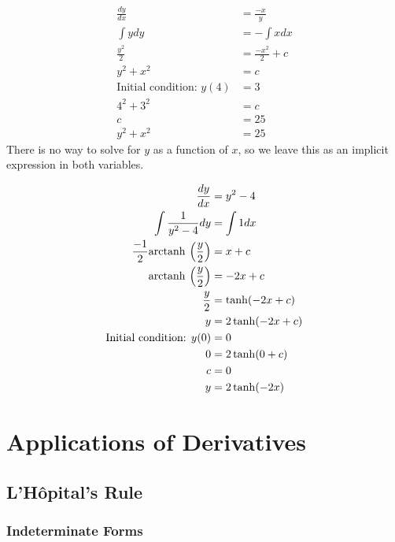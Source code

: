 \documentclass[fleqn]{report}
\begin{document}
\begin{example}
\begin{align*}
\frac{dy}{dx} & = \frac{-x}{y} \\
\int y dy & = - \int x dx \\
\frac{y^2}{2} & = \frac{-x^2}{2} + c \\
y^2 + x^2 & = c \\
\text{Initial condition: } y(4) & = 3 \\
4^2 + 3^2 & = c \\
c & = 25 \\
y^2 + x^2 & = 25
\end{align*}
There is no way to solve for $y$ as a function of $x$, so we
leave this as an implicit expression in both variables.
\end{example}

\begin{example}
\begin{align*}
\frac{dy}{dx} & = y^2 - 4 \\
\int \frac{1}{y^2-4} dy & = \int 1 dx \\
\frac{-1}{2} \mathrm{arctanh\hspace{0.07cm}} \left( \frac{y}{2} \right) & = x + c \\
\mathrm{arctanh\hspace{0.07cm}} \left( \frac{y}{2} \right) & = -2x + c \\
\frac{y}{2} & = \tanh (-2x + c) \\
y & = 2 \tanh (-2x + c) \\
\text{Initial condition: } y(0) & = 0 \\
0 & = 2 \tanh (0 + c) \\
c & = 0 \\
y & = 2 \tanh (-2x)
\end{align*}
\end{example}

\chapter{Applications of Derivatives}
\label{applications-derivatives}

\section{L'H\^opital's Rule}
\label{h-rule}

\subsection{Indeterminate Forms}
\label{intederminate-forms}
\end{document}
